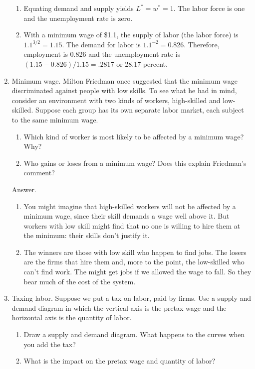 \begin{enumerate}
\begin{enumerate}
\item Equating demand and supply
yields $L^{*}=w^{*}=1$. The labor force is one and the
unemployment rate is zero.

\item With a minimum wage of \$1.1, the supply of labor (the labor
force) is $1.1^{{3}/{2}} = 1.15$. The demand for labor is
$1.1^{-2}=0.826$. Therefore, employment is 0.826 and the
unemployment rate is $(1.15-0.826)/{1.15}= .2817$ or 28.17 percent.
\end{enumerate}


\item Minimum wage.
Milton Friedman once suggested that the minimum wage discriminated against
people with low skills.
To see what he had in mind, consider an environment with two kinds of workers,
high-skilled and low-skilled.
Suppose each group has its own separate labor market,
each subject to the same minimum wage.
%
\begin{enumerate}
\item Which kind of worker is most likely to be affected by
a minimum wage?  Why?
\item Who gains or loses from a minimum wage?
Does this explain Friedman's comment?
\end{enumerate}

Answer.
\begin{enumerate}
\item You might imagine that high-skilled workers will not be affected by a minimum wage,
since their skill demands a wage well above it.
But workers with low skill might find that no one is willing
to hire them at the minimum:  their skills don't justify it.
\item The winners are those with low skill who happen to find jobs.
The losers are the firms that hire them and, more to the point,
the low-skilled who can't find work.
The might get jobs if we allowed the wage to fall.
So they bear much of the cost of the system.
\end{enumerate}

\item Taxing labor.  Suppose we put a tax on labor, paid by firms.
Use a supply and demand diagram in which the vertical axis is the pretax wage
and the horizontal axis is the quantity of labor.
\begin{enumerate}
\item Draw a supply and demand diagram.
What happens to the curves when you add the tax?
\item What is the impact on the pretax wage and quantity of labor?
\end{enumerate}


\end{enumerate}

